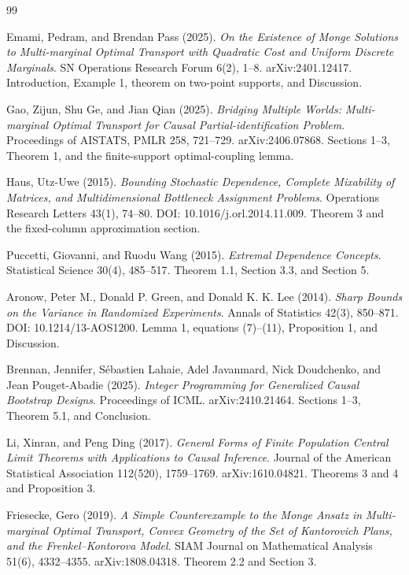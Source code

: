 \documentclass{article}
\begin{document}
\begin{thebibliography}{99}

   Emami, Pedram, and Brendan Pass (2025). \emph{On the Existence of Monge Solutions to Multi-marginal Optimal Transport with Quadratic Cost and Uniform Discrete Marginals}. SN Operations Research Forum 6(2), 1--8. arXiv:2401.12417. Introduction, Example 1, theorem on two-point supports, and Discussion.

   Gao, Zijun, Shu Ge, and Jian Qian (2025). \emph{Bridging Multiple Worlds: Multi-marginal Optimal Transport for Causal Partial-identification Problem}. Proceedings of AISTATS, PMLR 258, 721--729. arXiv:2406.07868. Sections 1--3, Theorem 1, and the finite-support optimal-coupling lemma.

   Haus, Utz-Uwe (2015). \emph{Bounding Stochastic Dependence, Complete Mixability of Matrices, and Multidimensional Bottleneck Assignment Problems}. Operations Research Letters 43(1), 74--80. DOI: 10.1016/j.orl.2014.11.009. Theorem 3 and the fixed-column approximation section.

   Puccetti, Giovanni, and Ruodu Wang (2015). \emph{Extremal Dependence Concepts}. Statistical Science 30(4), 485--517. Theorem 1.1, Section 3.3, and Section 5.

   Aronow, Peter M., Donald P. Green, and Donald K. K. Lee (2014). \emph{Sharp Bounds on the Variance in Randomized Experiments}. Annals of Statistics 42(3), 850--871. DOI: 10.1214/13-AOS1200. Lemma 1, equations (7)--(11), Proposition 1, and Discussion.

   Brennan, Jennifer, S\'{e}bastien Lahaie, Adel Javanmard, Nick Doudchenko, and Jean Pouget-Abadie (2025). \emph{Integer Programming for Generalized Causal Bootstrap Designs}. Proceedings of ICML. arXiv:2410.21464. Sections 1--3, Theorem 5.1, and Conclusion.

   Li, Xinran, and Peng Ding (2017). \emph{General Forms of Finite Population Central Limit Theorems with Applications to Causal Inference}. Journal of the American Statistical Association 112(520), 1759--1769. arXiv:1610.04821. Theorems 3 and 4 and Proposition 3.

   Friesecke, Gero (2019). \emph{A Simple Counterexample to the Monge Ansatz in Multi-marginal Optimal Transport, Convex Geometry of the Set of Kantorovich Plans, and the Frenkel--Kontorova Model}. SIAM Journal on Mathematical Analysis 51(6), 4332--4355. arXiv:1808.04318. Theorem 2.2 and Section 3.


\end{thebibliography}
\end{document}
